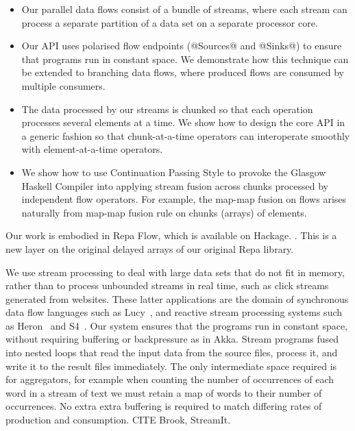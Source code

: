 \begin{itemize}
\item Our parallel data flows consist of a bundle of streams, where each stream can process a separate partition of a data set on a separate processor core.

\item Our API uses polarised flow endpoints (@Sources@ and @Sinks@) to ensure that programs run in constant space. We demonstrate how this technique can be extended to branching data flows, where produced flows are consumed by multiple consumers.

\item The data processed by our streams is chunked so that each operation processes several elements at a time. We show how to design the core API in a generic fashion so that chunk-at-a-time operators can interoperate smoothly with element-at-a-time operators.

\item We show how to use Continuation Passing Style to provoke the Glasgow Haskell Compiler into applying stream fusion across chunks processed by independent flow operators. For example, the map-map fusion on flows arises naturally from map-map fusion rule on chunks (arrays) of elements.
\end{itemize}

Our work is embodied in Repa Flow, which is available on Hackage.  \cite{Lippmeier:Guiding, Lippmeier:DataFlow}. This is a new layer on the original delayed arrays of our original Repa library.

We use stream processing to deal with large data sets that do not fit in memory,
rather than to process unbounded streams in real time, such as click streams generated from websites. These latter applications are the domain of synchronous data flow languages such as Lucy~\cite{Mandel:Lucy}, and reactive stream processing systems such as Heron~\cite{Kulkarn:Heron} and S4~\cite{Neumeyer:S4}. Our system ensures that the programs run in constant space, without requiring buffering or backpressure as in Akka. Stream programs fused into nested loops that read the input data from the source files, process it, and write it to the result files immediately. The only intermediate space required is for aggregators, for example when counting the number of occurrences of each word in a stream of text we must retain a map of words to their number of occurrences. No extra extra buffering is required to match differing rates of production and consumption. CITE Brook, StreamIt.

